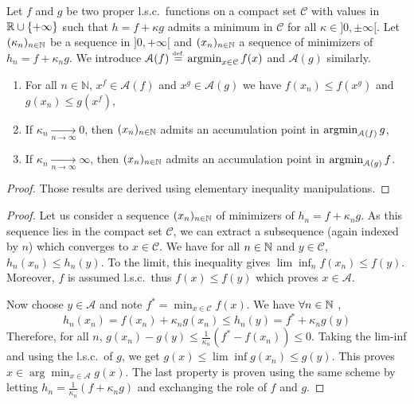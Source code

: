 \begin{lemma}
Let $f$ and $g$ be two proper l.s.c.\ functions on a compact set $\mathcal{C}$ with values in $\mathbb{R}\cup \{+\infty \}$ such that $h = f + \kappa g$ admits a minimum in $\mathcal{C}$ for all $\kappa \in ]0,\pm\infty[$. Let $(\kappa_n)_{n\in\mathbb{N}}$ be a sequence in $]0,+\infty[$ and $(x_n)_{n\in \mathbb{N}}$ a sequence of minimizers of $h_n = f+\kappa_n g$. We introduce $\mathcal{A}(f) \stackrel{\mbox{\upshape\tiny def.}}{=} \operatorname*{argmin}_{x\in \mathcal{C}} f(x)$ and $\mathcal{A}(g)$ similarly.
\begin{enumerate}
\item For all $n\in \mathbb{N}$, $x^f\in \mathcal{A}(f)$ and $x^g\in \mathcal{A}(g)$ we have $f(x_n)\leq f(x^g)$ and $g(x_n) \leq g(x^f)$,
\item If  $\kappa_n \underset{n \to \infty}{\to} 0$, then $(x_n)_{n\in \mathbb{N}}$ admits an accumulation point in $ \operatorname*{argmin}_{\mathcal{A}(f)} g $,
\item If  $\kappa_n \underset{n \to \infty}{\to} \infty$, then $(x_n)_{n\in \mathbb{N}}$ admits an accumulation point in $\operatorname*{argmin}_{\mathcal{A}(g)} f$.
\end{enumerate}
\end{lemma}

\begin{proof}
Those results are derived using elementary inequality manipulations.
\end{proof}
\iffalse %
\begin{proof}
Let us consider a sequence $(x_n)_{n\in \mathbb{N}}$ of minimizers of $h_n=f+\kappa_n g$. As this sequence lies in the compact set $\mathcal{C}$, we can extract a subsequence (again indexed by $n$) which converges to $x\in \mathcal{C}$. We have for all $n \in \mathbb{N}$ and $y\in \mathcal{C}$, $h_n(x_n)\leq h_n(y)$. To the limit, this inequality gives $\lim \inf_n f(x_n) \leq f(y)$. Moreover, $f$ is assumed l.s.c.\ thus $f(x)\leq f(y)$ which proves $x\in \mathcal{A}$.

Now choose $y\in \mathcal{A}$ and note $f^*=\min_{x\in\mathcal{C}} f(x)$. We have $\forall n\in \mathbb{N}$ , 
\[
h_n(x_n) = f(x_n) + \kappa_n g(x_n) \leq h_n(y)=f^* + \kappa_n g(y)
\]
Therefore, for all $n$, $g(x_n)-g(y)\leq \frac{1}{\kappa_n}(f^*-f(x_n))\leq 0$. Taking the lim-inf and using the l.s.c.\ of $g$, we get $g(x) \leq \lim \inf g(x_n)\leq g(y)$. This proves $x\in \arg \min_{x\in\mathcal{A}} g(x)$. The last property is proven using the same scheme by letting $h_n=\frac{1}{\kappa_n}(f+\kappa_n g)$ and exchanging the role of $f$ and $g$.
\end{proof}

